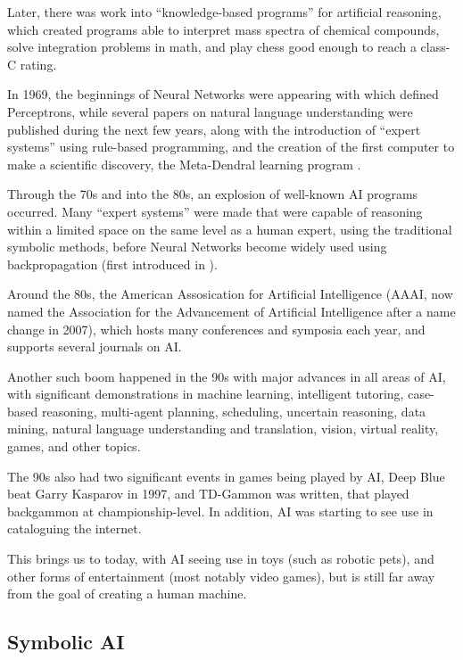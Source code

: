 \documentclass[]{report}
\begin{document}
Later, there was work into ``knowledge-based programs'' for artificial
reasoning, which created programs able to interpret mass spectra of chemical
compounds, solve integration problems in math, and play chess good enough to
reach a class-C rating.

In 1969, the beginnings of Neural Networks were appearing with
\citet{minsky1969perceptrons} which defined Perceptrons, while several papers on
natural language understanding were published during the next few years, along
with the introduction of ``expert systems'' using rule-based programming, and
the creation of the first computer to make a scientific discovery, the
Meta-Dendral learning program \citep{buchanan1976applications}.

Through the 70s and into the 80s, an explosion of well-known AI programs
occurred. Many ``expert systems'' were made that were capable of reasoning
within a limited space on the same level as a human expert, using the
traditional symbolic methods, before Neural Networks become widely used using
backpropagation (first introduced in \citet{werbos1974beyond}).

Around the 80s, the American Assosication for Artificial Intelligence (AAAI, now
named the Association for the Advancement of Artificial Intelligence after a
name change in 2007), which hosts many conferences and symposia each year, and
supports several journals on AI.

Another such boom happened in the 90s with major advances in all areas of AI,
with significant demonstrations in machine learning, intelligent tutoring,
case-based reasoning, multi-agent planning, scheduling, uncertain reasoning,
data mining, natural language understanding and translation, vision, virtual
reality, games, and other topics.

The 90s also had two significant events in games being played by AI, Deep Blue
beat Garry Kasparov in 1997, and TD-Gammon was written, that played backgammon
at championship-level. In addition, AI was starting to see use in cataloguing
the internet.

This brings us to today, with AI seeing use in toys (such as robotic pets), and
other forms of entertainment (most notably video games), but is still far away
from the goal of creating a human machine.

\subsection{Symbolic AI}
\label{sec:symbolic-ai}
\end{document}
